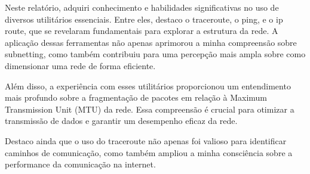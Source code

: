 \documentclass{article}
\begin{document}
Neste relatório, adquiri conhecimento e habilidades significativas no uso de diversos utilitários essenciais. Entre eles, destaco o traceroute, o ping, e o ip route, que se revelaram fundamentais para explorar a estrutura da rede. A aplicação dessas ferramentas não apenas aprimorou a minha compreensão sobre subnetting, como também contribuiu para uma percepção mais ampla sobre como dimensionar uma rede de forma eficiente.

Além disso, a experiência com esses utilitários proporcionou um entendimento mais profundo sobre a fragmentação de pacotes em relação à Maximum Transmission Unit (MTU) da rede. Essa compreensão é crucial para otimizar a transmissão de dados e garantir um desempenho eficaz da rede.

Destaco ainda que o uso do traceroute não apenas foi valioso para identificar caminhos de comunicação, como também ampliou a minha consciência sobre a performance da comunicação na internet.
\end{document}
